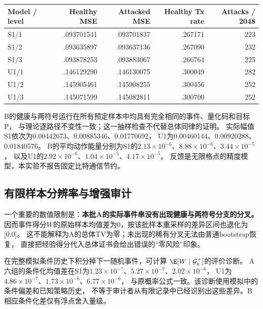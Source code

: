 \begin{table}[ht]
\centering\footnotesize
{}
\label{tab:e1-health}
\begin{tabular}{lrrrr}
\toprule
Model / level & Healthy MSE & Attacked MSE & Healthy Tx rate & Attacks / 2048\\
\midrule
S1/1 & .093701541 & .093701837 & .267171 & 223\\
S1/2 & .093635897 & .093637136 & .267090 & 232\\
S1/3 & .093878253 & .093883067 & .266764 & 225\\
U1/1 & .146129290 & .146130075 & .300049 & 282\\
U1/2 & .145905461 & .145908255 & .300456 & 252\\
U1/3 & .145071599 & .145082811 & .300700 & 252\\
\bottomrule
\end{tabular}
\end{table}
B的健康与两符号运行在所有预定样本中均具有完全相同的事件、量化码和目标P，
与理论逐路径不变性一致；这一抽样检查不代替总体同律的证明。
实际幅值S1依次为0.00442673、0.00885346、0.01770692，
U1为0.00460144、0.00920288、0.01840576。
B的平均动作能量分别为S1的$2.13\times10^{-6}$、$8.88\times10^{-6}$、$3.44\times10^{-5}$，
以及U1的$2.92\times10^{-6}$、$1.04\times10^{-5}$、$4.17\times10^{-5}$。
反馈是无限格点的精度模型，本实验不报告固定比特通信节约。

\subsection{有限样本分辨率与增强审计}
一个重要的数值限制是：\textbf{本批A的实际事件串没有出现健康与两符号分支的分叉。}
因而事件得分$W$的原始样本均值差为0，按该批样本重采样的差异区间也退化为[0,0]。
这不能解释为A的总体TV为零；未出现的稀有分叉无法由普通bootstrap恢复，
直接把经验得分代入总体证书会给出错误的“零风险”印象。

在完整模拟条件历史下积分掉下一随机事件，可计算
$\E[W\mid\mathcal G_k^+]$的评价诊断。
A六组的条件化均值差在S1为$1.23\times10^{-7}$、$5.27\times10^{-7}$、$2.02\times10^{-6}$，
U1为$4.86\times10^{-7}$、$1.73\times10^{-6}$、$6.77\times10^{-6}$，
与原概率公式一致。该诊断使用模拟中的条件偏差和已知策略历史，
不等于审计者从有限记录中已经识别出这些差异。B相应条件化差仅有浮点舍入量级。

